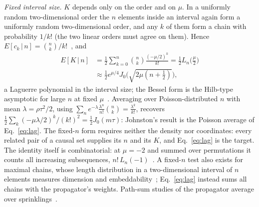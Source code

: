 \documentclass[prd,twocolumn,superscriptaddress,nofootinbib,amsmath,amssymb,floatfix]{revtex4-2}
\begin{document}
\emph{Fixed interval size.} $K$ depends only on the order and on $\mu$. In a uniformly random two-dimensional order the $n$ elements inside an interval again form a uniformly random two-dimensional order, and any $k$ of them form a chain with probability $1/k!$ (the two linear orders must agree on them). Hence $E[c_k\,|\,n]=\binom nk/k!$~\cite{Pinsky06}, and
\begin{equation}
\begin{aligned}
E[K\,|\,n]&=\frac12\sum_{k=0}^n\binom nk\frac{(-\mu/2)^k}{k!}=\frac12L_n\!\Big(\frac\mu2\Big)\\
&\approx\frac12e^{\mu/4}J_0\Big(\sqrt{2\mu(n+\tfrac12)}\Big),
\end{aligned}
\label{eq:lag}
\end{equation}
a Laguerre polynomial in the interval size; the Bessel form is the Hilb-type asymptotic for large $n$ at fixed $\mu$~\cite{Szego39}. Averaging over Poisson-distributed $n$ with mean $\lambda=\rho\tau^2/2$, using $\sum_ne^{-\lambda}\frac{\lambda^n}{n!}\binom nk=\frac{\lambda^k}{k!}$, recovers $\tfrac12\sum_k(-\mu\lambda/2)^k/(k!)^2=\tfrac12J_0(m\tau)$: Johnston's result is the Poisson average of Eq.~\eqref{eq:lag}. The fixed-$n$ form requires neither the density nor coordinates: every related pair of a causal set supplies its $n$ and its $K$, and Eq.~\eqref{eq:lag} is the target. The identity itself is combinatorial: at $\mu=-2$ and summed over permutations it counts all increasing subsequences, $n!\,L_n(-1)$~\cite{LifschitzPittel81,OEIS}. A fixed-$n$ test also exists for maximal chains, whose length distribution in a two-dimensional interval of $n$ elements measures dimension and embeddability~\cite{ABP18}; Eq.~\eqref{eq:lag} instead sums all chains with the propagator's weights. Path-sum studies of the propagator average over sprinklings~\cite{Shuman23,KastratiHinrichsen26}.
\end{document}
